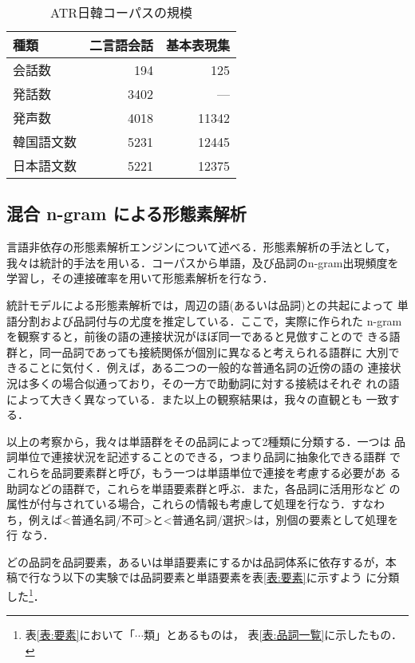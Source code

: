 \begin{table}
\begin{center}
\caption{ATR日韓コーパスの規模}
\label{表:コーパス}
\begin{tabular}{l|rr}
\hline\hline
種類   & 二言語会話 & 基本表現集 \\
\hline
会話数 &        194 &   125 \\
発話数 &       3402 &  ---  \\
発声数 &       4018 & 11342 \\
韓国語文数 &   5231 & 12445 \\
日本語文数 &   5221 & 12375 \\
\hline
\end{tabular}
\end{center}
\end{table}


\subsection{混合 n-gram による形態素解析}

言語非依存の形態素解析エンジンについて述べる．形態素解析の手法として，
我々は統計的手法を用いる．コーパスから単語，及び品詞のn-gram出現頻度を
学習し，その連接確率を用いて形態素解析を行なう．

統計モデルによる形態素解析では，周辺の語(あるいは品詞)との共起によって
単語分割および品詞付与の尤度を推定している．ここで，実際に作られた
n-gramを観察すると，前後の語の連接状況がほぼ同一であると見倣すことので
きる語群と，同一品詞であっても接続関係が個別に異なると考えられる語群に
大別できることに気付く．例えば，ある二つの一般的な普通名詞の近傍の語の
連接状況は多くの場合似通っており，その一方で助動詞に対する接続はそれぞ
れの語によって大きく異なっている．また以上の観察結果は，我々の直観とも
一致する．

以上の考察から，我々は単語群をその品詞によって2種類に分類する．一つは
品詞単位で連接状況を記述することのできる，つまり品詞に抽象化できる語群
でこれらを品詞要素群と呼び，もう一つは単語単位で連接を考慮する必要があ
る助詞などの語群で，これらを単語要素群と呼ぶ．また，各品詞に活用形など
の属性が付与されている場合，これらの情報も考慮して処理を行なう．すなわ
ち，例えば<普通名詞/不可>と<普通名詞/選択>は，別個の要素として処理を行
なう．

どの品詞を品詞要素，あるいは単語要素にするかは品詞体系に依存するが，本
稿で行なう以下の実験では品詞要素と単語要素を表\ref{表:要素}に示すよう
に分類した\footnote{表\ref{表:要素}において「$\cdots$類」とあるものは，
表\ref{表:品詞一覧}に示したもの．}．

